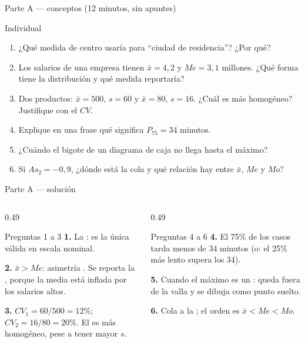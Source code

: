 \documentclass[aspectratio=169,10pt]{beamer}
\begin{document}
\begin{frame}{Parte A — conceptos (12 minutos, sin apuntes)}
  \begin{alertblock}{Individual}
    \scriptsize
    \begin{enumerate}\setlength{\itemsep}{-0.05cm}
      \item ¿Qué medida de centro usaría para ``ciudad de residencia''? ¿Por qué?
      \item Los salarios de una empresa tienen $\bar{x}=4{,}2$ y $Me=3{,}1$
            millones. ¿Qué forma tiene la distribución y qué medida reportaría?
      \item Dos productos: $\bar{x}=500$, $s=60$ y $\bar{x}=80$, $s=16$.
            ¿Cuál es más homogéneo? Justifique con el $CV$.
      \item Explique en una frase qué significa $P_{75} = 34$ minutos.
      \item ¿Cuándo el bigote de un diagrama de caja no llega hasta el máximo?
      \item Si $As_2 = -0{,}9$, ¿dónde está la cola y qué relación hay entre
            $\bar{x}$, $Me$ y $Mo$?
    \end{enumerate}
  \end{alertblock}
\end{frame}

\begin{frame}{Parte A — solución}
  \scriptsize
  \begin{columns}[T,onlytextwidth]
    \begin{column}{0.49\textwidth}
      \begin{block}{Preguntas 1 a 3}
        \scriptsize
        \textbf{1.} La : es la única válida en escala nominal.

        \textbf{2.} $\bar{x} > Me$: asimetría . Se reporta la
        , porque la media está inflada por los salarios
        altos.

        \textbf{3.} $CV_1 = 60/500 = 12\%$; \ $CV_2 = 16/80 = 20\%$.
        El  es más homogéneo, pese a tener mayor $s$.
      \end{block}
    \end{column}
    \begin{column}{0.49\textwidth}
      \begin{exampleblock}{Preguntas 4 a 6}
        \scriptsize
        \textbf{4.} El 75\% de los casos tarda menos de 34 minutos (o: el
        25\% más lento supera los 34).

        \textbf{5.} Cuando el máximo es un : queda fuera
        de la valla y se dibuja como punto suelto.

        \textbf{6.} Cola a la ; el orden es
        $\bar{x} < Me < Mo$.
      \end{exampleblock}
    \end{column}
  \end{columns}
\end{frame}
\end{document}
